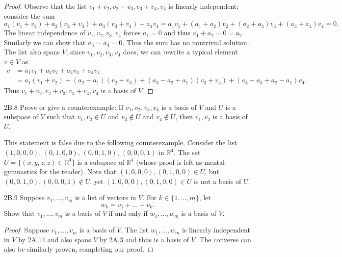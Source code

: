 \documentclass{exam}
\begin{document}
\begin{proof}
    Observe that the list $v_1 + v_2, v_2 + v_3, v_3 + v_4, v_4$ is linearly independent; consider the sum \[
        a_1(v_1 + v_2) + a_2(v_2 + v_3) + a_3(v_3 + v_4) + a_4v_4 = a_1v_1 + (a_1 + a_2)v_2 + (a_2 + a_3)v_3 + (a_3 + a_4)v_4 = 0.
    \]
    The linear independence of $v_1, v_2, v_3, v_4$ forces $a_1 = 0$ and thus $a_1 + a_2 = 0 = a_2$. Similarly we can show that $a_3 = a_4 = 0$. Thus the sum has no nontrivial solution. The list also spans $V$; since $v_1, v_2, v_3, v_4$ does, we can rewrite a typical element $v\in V$ as
    \begin{align*}
        v &= a_1v_1 + a_2v_2 + a_3v_3 + a_4v_4\\
        &= a_1(v_1 + v_2) + (a_2 - a_1)(v_2 + v_3) + (a_3 - a_2 + a_1)(v_3 + v_4) + (a_4 - a_3 + a_2 - a_1)v_4.
    \end{align*}
    Thus $v_1 + v_2, v_2 + v_3, v_3 + v_4, v_4$ is a basis of $V$.
\end{proof}

\begin{problem}{2B.8}
    Prove or give a counterexample: If $v_1, v_2, v_3, v_4$ is a basis of $V$ and $U$ is a subspace of $V$ such that $v_1, v_2\in U$ and $v_3\notin U$ and $v_4\notin U$, then $v_1, v_2$ is a basis of $U$.
\end{problem}

This statement is false due to the following counterexample. Consider the list $(1, 0, 0, 0)$, $(0, 1, 0, 0)$, $(0, 0, 1, 0)$, $(0, 0, 0, 1)$ in $\mathbb R^4$. The set $U = \{(x, y, z, z)\in\mathbb R^4\}$ is a subspace of $\mathbb R^4$ (whose proof is left as mental gymnastics for the reader). Note that $(1, 0, 0, 0), (0, 1, 0, 0) \in U$, but $(0, 0, 1, 0), (0, 0, 0, 1)\notin U$, yet $(1, 0, 0, 0), (0, 1, 0, 0) \in U$ is not a basis of $U$.

\begin{problem}{2B.9}
    Suppose $v_1, \dots, v_m$ is a list of vectors in $V$. For $k\in\{1, \dots, m\}$, let \[
        w_k = v_1 + \dots + v_k.
    \]
    Show that $v_1, \dots, v_m$ is a basis of $V$ if and only if $w_1, \dots, w_m$ is a basis of $V$.
\end{problem}

\begin{proof}
    Suppose $v_1, \dots, v_m$ is a basis of $V$. The list $w_1, \dots, w_m$ is linearly independent in $V$ by 2A.14 and also spans $V$ by 2A.3 and thus is a basis of $V$. The converse can also be similarly proven, completing our proof.
\end{proof}
\end{document}
